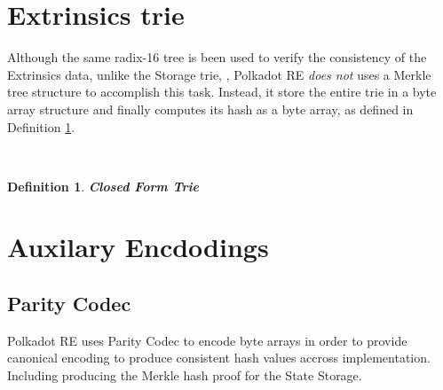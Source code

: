 \documentclass{article}
\newcommand{\tmem}[1]{{\em #1\/}}
\newcommand{\tmstrong}[1]{\textbf{#1}}
\newtheorem{definition}{Definition}
\begin{document}
\section{Extrinsics trie}

Although the same radix-16 tree is been used to verify the consistency of the
Extrinsics data, unlike the Storage trie, , Polkadot RE {\tmem{does not}} uses
a Merkle tree structure to accomplish this task. Instead, it store the entire
trie in a byte array structure and finally computes its hash as a byte array,
as defined in Definition \ref{def-closed-form-trie}.

\

\begin{definition}
  \label{def-closed-form-trie}{\tmstrong{Closed Form Trie}} {}
\end{definition}

\section{Auxilary Encdodings}

\subsection{Parity Codec}

Polkadot RE uses Parity Codec to encode byte arrays in order to provide
canonical encoding to produce consistent hash values accross implementation.
Including producing the Merkle hash proof for the State Storage.

\
\end{document}
